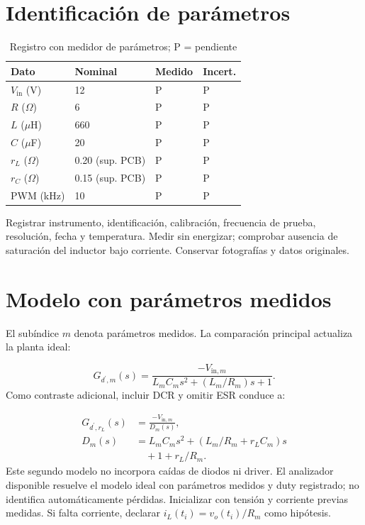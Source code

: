 \documentclass[conference,letterpaper]{IEEEtran}
\begin{document}
\section{Identificación de parámetros}
\begin{table}[H]\caption{Registro con medidor de parámetros; P = pendiente}\label{tab:measured}\centering\footnotesize\setlength{\tabcolsep}{2pt}\renewcommand{\arraystretch}{1.18}\begin{tabularx}{\columnwidth}{LYYY}\toprule
Dato & Nominal & Medido & Incert.\\\midrule
$V_{\mathrm{in}}$ (V) & 12 & P & P\\
$R$ ($\Omega$) & 6 & P & P\\
$L$ ($\mu$H) & 660 & P & P\\
$C$ ($\mu$F) & 20 & P & P\\
$r_L$ ($\Omega$) & 0.20 (sup. PCB) & P & P\\
$r_C$ ($\Omega$) & 0.15 (sup. PCB) & P & P\\
PWM (kHz) & 10 & P & P\\\bottomrule\end{tabularx}\end{table}
Registrar instrumento, identificación, calibración, frecuencia de prueba, resolución, fecha y temperatura. Medir sin energizar; comprobar ausencia de saturación del inductor bajo corriente. Conservar fotografías y datos originales.

\section{Modelo con parámetros medidos}
El subíndice $m$ denota parámetros medidos. La comparación principal actualiza la planta ideal:

\begin{equation}\label{eq:measuredplant}G_{d^{\prime},m}(s)=\frac{-V_{\mathrm{in},m}}{L_mC_ms^2+(L_m/R_m)s+1}.\end{equation}
Como contraste adicional, incluir DCR y omitir ESR conduce a:

\begin{equation}\label{eq:lossplant}\begin{aligned}G_{d^{\prime},r_L}(s)&=\frac{-V_{\mathrm{in},m}}{D_m(s)},\\D_m(s)&=L_mC_ms^2+(L_m/R_m+r_LC_m)s\\&\quad+1+r_L/R_m.\end{aligned}\end{equation}
Este segundo modelo no incorpora caídas de diodos ni driver. El analizador disponible resuelve el modelo ideal con parámetros medidos y duty registrado; no identifica automáticamente pérdidas. Inicializar con tensión y corriente previas medidas. Si falta corriente, declarar $i_L(t_i)=v_o(t_i)/R_m$ como hipótesis.
\end{document}
